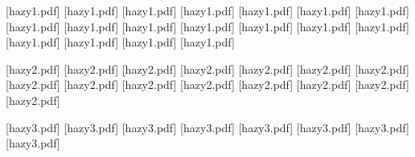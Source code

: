 [hazy1.pdf]
[hazy1.pdf]
[hazy1.pdf]
[hazy1.pdf]
[hazy1.pdf]
[hazy1.pdf]
[hazy1.pdf]
[hazy1.pdf]
[hazy1.pdf]
[hazy1.pdf]
[hazy1.pdf]
[hazy1.pdf]
[hazy1.pdf]
[hazy1.pdf]
[hazy1.pdf]
[hazy1.pdf]
[hazy1.pdf]
[hazy1.pdf]

[hazy2.pdf]
[hazy2.pdf]
[hazy2.pdf]
[hazy2.pdf]
[hazy2.pdf]
[hazy2.pdf]
[hazy2.pdf]
[hazy2.pdf]
[hazy2.pdf]
[hazy2.pdf]
[hazy2.pdf]
[hazy2.pdf]
[hazy2.pdf]
[hazy2.pdf]
[hazy2.pdf]

[hazy3.pdf]
[hazy3.pdf]
[hazy3.pdf]
[hazy3.pdf]
[hazy3.pdf]
[hazy3.pdf]
[hazy3.pdf]
[hazy3.pdf]

\raggedright
\setlength{\parindent}{4mm}

